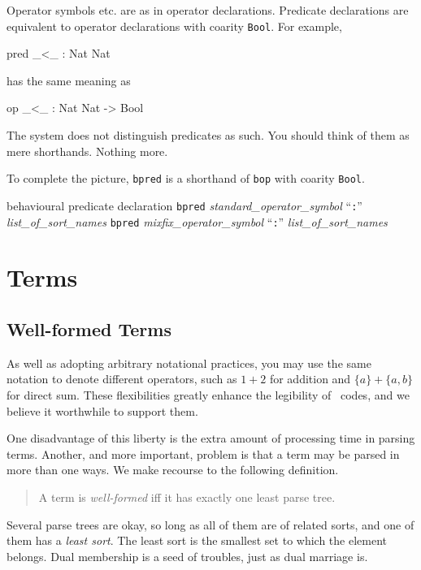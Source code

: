 \documentclass[a4paper]{memoir}
\begin{document}
Operator symbols etc. are as in operator declarations. Predicate
declarations are equivalent to operator declarations with
coarity \verb|Bool|. For example,
\begin{vvtm}
\begin{ccode}
  pred _<_ : Nat Nat
\end{ccode}
\end{vvtm}
has the same meaning as
\begin{vvtm}
\begin{ccode}
  op _<_ : Nat Nat -> Bool
\end{ccode}
\end{vvtm}
\begin{warning}
  The system does not distinguish predicates as such.
  You should think of them as mere shorthands. Nothing more.
\end{warning}

To complete the picture,
\verb|bpred| is a shorthand of \verb|bop| with coarity \verb|Bool|.

\begin{bsyntax} behavioural predicate declaration  \Hline
\texttt{bpred} \textit{standard\_operator\_symbol} ``\texttt{:}'' \textit{list\_of\_sort\_names}
\texttt{bpred} \textit{mixfix\_operator\_symbol} ``\texttt{:}'' \textit{list\_of\_sort\_names}
\end{bsyntax}

\section{Terms}\label{sec:p2-terms}

\subsection{Well-formed Terms}\label{sec:p2-wff-terms}

As well as adopting arbitrary notational practices, you may
use the same notation to denote different operators, such as
$1 + 2$ for addition and $\{ a \} + \{ a, b \}$ for
direct sum. These flexibilities greatly enhance the
legibility of \cafeobj~codes, and we believe it worthwhile to support
them.

One disadvantage of this liberty is the extra amount of processing time
in parsing terms. Another, and more important, problem is that a term may
be parsed in more than one ways. We make recourse to the following
definition.
\begin{quote}
A term is {\em well-formed} iff it has
exactly one least parse tree.
\end{quote}
Several parse trees are okay, so long as all of them are of
related sorts, and one of them has a {\em least sort}.
The least sort is the smallest set to which the element belongs.
Dual membership is a seed of troubles, just as dual marriage is.
\end{document}
